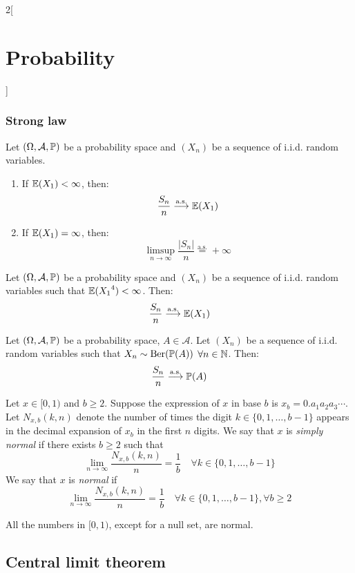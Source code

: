 \documentclass[../../../main.tex]{subfiles}
\begin{document}
\begin{multicols}{2}[\section{Probability}]
  \subsubsection{Strong law}
  \begin{theorem}
    Let $(\Omega,\mathcal{A},\mathbb{P})$ be a probability space and $(X_n)$ be a sequence of i.i.d. random variables.
    \begin{enumerate}
      \item If $\mathbb{E}(X_1)<\infty$, then: $$\frac{S_n}{n}\overset{\text{a.s.}}{\longrightarrow}\mathbb{E}(X_1)$$
      \item If $\mathbb{E}(X_1)=\infty$, then: $$\limsup_{n\to\infty}\frac{|S_n|}{n}\overset{\text{a.s.}}{=}+\infty$$
    \end{enumerate}
  \end{theorem}
  \begin{theorem}
    Let $(\Omega,\mathcal{A},\mathbb{P})$ be a probability space and $(X_n)$ be a sequence of i.i.d. random variables such that $\mathbb{E}({X_1}^4)<\infty$. Then: $$\frac{S_n}{n}\overset{\text{a.s.}}{\longrightarrow}\mathbb{E}(X_1)$$
  \end{theorem}
  \begin{corollary}
    Let $(\Omega,\mathcal{A},\mathbb{P})$ be a probability space, $A\in\mathcal{A}$. Let $(X_n)$ be a sequence of i.i.d. random variables such that $X_n\sim\text{Ber}(\mathbb{P}(A))$ $\forall n\in\mathbb{N}$. Then: $$\frac{S_n}{n}\overset{\text{a.s.}}{\longrightarrow}\mathbb{P}(A)$$
  \end{corollary}
  \begin{definition}
    Let $x\in[0,1)$ and $b\geq 2$. Suppose the expression of $x$ in base $b$ is $x_b=0.a_1a_2a_3\cdots$. Let $N_{x,b}(k,n)$ denote the number of times the digit $k\in\{0,1,\ldots,b-1\}$ appears in the decimal expansion of $x_b$ in the first $n$ digits. We say that $x$ is \emph{simply normal} if there exists $b\geq 2$ such that $$\lim_{n\to\infty}\frac{N_{x,b}(k,n)}{n}=\frac{1}{b}\quad\forall k\in\{0,1,\ldots,b-1\}$$
    We say that $x$ is \emph{normal} if $$\lim_{n\to\infty}\frac{N_{x,b}(k,n)}{n}=\frac{1}{b}\quad\forall k\in\{0,1,\ldots,b-1\}, \forall b\geq 2$$
  \end{definition}
  \begin{theorem}
    All the numbers in $[0,1)$, except for a null set, are normal.
  \end{theorem}
  \subsection{Central limit theorem}

\end{multicols}
\end{document}

